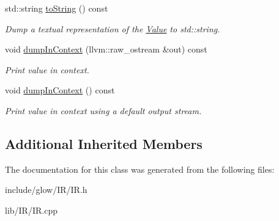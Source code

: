 \begin{DoxyCompactItemize}
\mbox{\label{classglow_1_1_value_aeaa7240f4916e9905237c74034502b30}} 
std\+::string \hyperlink{classglow_1_1_value_aeaa7240f4916e9905237c74034502b30}{to\+String} () const
\begin{DoxyCompactList}\small\item\em Dump a textual representation of the \hyperlink{classglow_1_1_value}{Value} to std\+::string. \end{DoxyCompactList}\item 
\mbox{\label{classglow_1_1_value_ad18fcb9b66c401c77222992095ddd1ee}} 
void \hyperlink{classglow_1_1_value_ad18fcb9b66c401c77222992095ddd1ee}{dump\+In\+Context} (llvm\+::raw\+\_\+ostream \&out) const
\begin{DoxyCompactList}\small\item\em Print value in context. \end{DoxyCompactList}\item 
\mbox{\label{classglow_1_1_value_add15fe15906f58afdc2043e63288e250}} 
void \hyperlink{classglow_1_1_value_add15fe15906f58afdc2043e63288e250}{dump\+In\+Context} () const
\begin{DoxyCompactList}\small\item\em Print value in context using a default output stream. \end{DoxyCompactList}\end{DoxyCompactItemize}
\subsection*{Additional Inherited Members}


The documentation for this class was generated from the following files\+:\begin{DoxyCompactItemize}
\item 
include/glow/\+I\+R/I\+R.\+h\item 
lib/\+I\+R/I\+R.\+cpp\end{DoxyCompactItemize}
